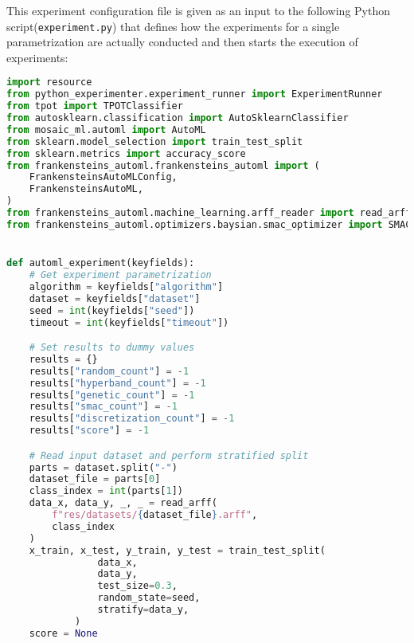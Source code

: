 This experiment configuration file is given as an input to the following Python script(\texttt{experiment.py}) that defines how the experiments for a single parametrization are actually conducted and then starts the execution of experiments:
\begin{lstlisting}[language=Python,basicstyle=\scriptsize]
import resource
from python_experimenter.experiment_runner import ExperimentRunner
from tpot import TPOTClassifier
from autosklearn.classification import AutoSklearnClassifier
from mosaic_ml.automl import AutoML
from sklearn.model_selection import train_test_split
from sklearn.metrics import accuracy_score
from frankensteins_automl.frankensteins_automl import (
    FrankensteinsAutoMLConfig,
    FrankensteinsAutoML,
)
from frankensteins_automl.machine_learning.arff_reader import read_arff
from frankensteins_automl.optimizers.baysian.smac_optimizer import SMAC


def automl_experiment(keyfields):
    # Get experiment parametrization
    algorithm = keyfields["algorithm"]
    dataset = keyfields["dataset"]
    seed = int(keyfields["seed"])
    timeout = int(keyfields["timeout"])

    # Set results to dummy values
    results = {}
    results["random_count"] = -1
    results["hyperband_count"] = -1
    results["genetic_count"] = -1
    results["smac_count"] = -1
    results["discretization_count"] = -1
    results["score"] = -1

    # Read input dataset and perform stratified split
    parts = dataset.split("-")
    dataset_file = parts[0]
    class_index = int(parts[1])
    data_x, data_y, _, _ = read_arff(
        f"res/datasets/{dataset_file}.arff",
        class_index 
    )
    x_train, x_test, y_train, y_test = train_test_split(
                data_x,
                data_y,
                test_size=0.3,
                random_state=seed,
                stratify=data_y,
            )
    score = None


\end{lstlisting}
